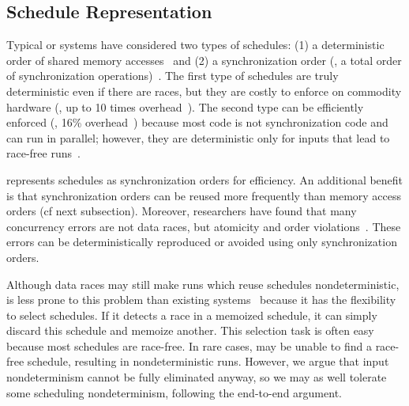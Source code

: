 \subsection{Schedule Representation}
\label{sec:tern-define-schedule}

Typical \smt or \dmt systems have considered two types of schedules: (1) a
deterministic order of shared memory
accesses~\cite{dmp:asplos09,coredet:asplos10} and (2) a synchronization
order (\ie, a total order of synchronization operations)~\cite{kendo:asplos09}. 
The first type of schedules are truly deterministic even if there are races, but
they are costly to enforce on commodity hardware (\eg, up to 10 times
overhead~\cite{coredet:asplos10}).  The second type can be efficiently enforced
(\eg, 16\% overhead~\cite{kendo:asplos09}) because most code is not
synchronization code and can run in parallel; however, they are deterministic
only for inputs that lead to race-free runs~\cite{recplay:tocs,kendo:asplos09}.

\tern represents schedules as synchronization orders for efficiency.  An
additional benefit is that synchronization orders can be reused more
frequently than memory access orders (cf next subsection).
Moreover, researchers have found that many concurrency errors
are not data races, but atomicity and order
violations~\cite{lu:concurrency-bugs}.  These errors can be
deterministically reproduced or avoided using only  synchronization orders.

Although data races may still make runs which reuse schedules nondeterministic,
\tern is less prone to this problem than existing \dmt
systems~\cite{kendo:asplos09} because it has the flexibility to select
schedules.  If it detects a race in a memoized schedule, it can simply
discard this schedule and memoize another.  This selection task is often
easy because most schedules are race-free.  In rare cases, \tern may be
unable to find a race-free schedule, resulting in nondeterministic runs.
However, we argue that input nondeterminism cannot be fully eliminated
anyway, so we may as well tolerate some scheduling nondeterminism,
following the end-to-end argument.



